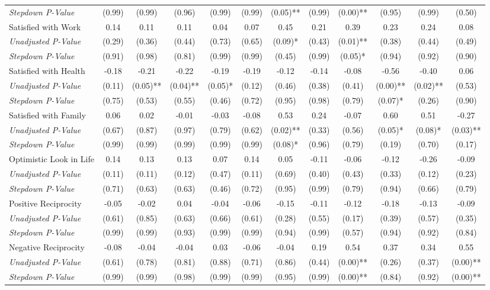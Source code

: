 \begin{tabular}{l c c c c c c c c c c c}
\quad \textit{Stepdown P-Value} & (0.99) & (0.99) & (0.96) & (0.99) & (0.99) & (0.05)** & (0.99) & (0.00)** & (0.95) & (0.99) & (0.50) \\
Satisfied with Work & 0.14 & 0.11 & 0.11 & 0.04 & 0.07 & 0.45 & 0.21 & 0.39 & 0.23 & 0.24 & 0.08 \\
\quad \textit{Unadjusted P-Value} & (0.29) & (0.36) & (0.44) & (0.73) & (0.65) & (0.09)* & (0.43) & (0.01)** & (0.38) & (0.44) & (0.49) \\
\quad \textit{Stepdown P-Value} & (0.91) & (0.98) & (0.81) & (0.99) & (0.99) & (0.45) & (0.99) & (0.05)* & (0.94) & (0.92) & (0.90) \\
Satisfied with Health & -0.18 & -0.21 & -0.22 & -0.19 & -0.19 & -0.12 & -0.14 & -0.08 & -0.56 & -0.40 & 0.06 \\
\quad \textit{Unadjusted P-Value} & (0.11) & (0.05)** & (0.04)** & (0.05)* & (0.12) & (0.46) & (0.38) & (0.41) & (0.00)** & (0.02)** & (0.53) \\
\quad \textit{Stepdown P-Value} & (0.75) & (0.53) & (0.55) & (0.46) & (0.72) & (0.95) & (0.98) & (0.79) & (0.07)* & (0.26) & (0.90) \\
Satisfied with Family & 0.06 & 0.02 & -0.01 & -0.03 & -0.08 & 0.53 & 0.24 & -0.07 & 0.60 & 0.51 & -0.27 \\
\quad \textit{Unadjusted P-Value} & (0.67) & (0.87) & (0.97) & (0.79) & (0.62) & (0.02)** & (0.33) & (0.56) & (0.05)* & (0.08)* & (0.03)** \\
\quad \textit{Stepdown P-Value} & (0.99) & (0.99) & (0.99) & (0.99) & (0.99) & (0.08)* & (0.96) & (0.79) & (0.19) & (0.70) & (0.17) \\
Optimistic Look in Life & 0.14 & 0.13 & 0.13 & 0.07 & 0.14 & 0.05 & -0.11 & -0.06 & -0.12 & -0.26 & -0.09 \\
\quad \textit{Unadjusted P-Value} & (0.11) & (0.11) & (0.12) & (0.47) & (0.11) & (0.69) & (0.40) & (0.43) & (0.33) & (0.12) & (0.23) \\
\quad \textit{Stepdown P-Value} & (0.71) & (0.63) & (0.63) & (0.46) & (0.72) & (0.95) & (0.99) & (0.79) & (0.94) & (0.66) & (0.79) \\
Positive Reciprocity & -0.05 & -0.02 & 0.04 & -0.04 & -0.06 & -0.15 & -0.11 & -0.12 & -0.18 & -0.13 & -0.09 \\
\quad \textit{Unadjusted P-Value} & (0.61) & (0.85) & (0.63) & (0.66) & (0.61) & (0.28) & (0.55) & (0.17) & (0.39) & (0.57) & (0.35) \\
\quad \textit{Stepdown P-Value} & (0.99) & (0.99) & (0.93) & (0.99) & (0.99) & (0.94) & (0.99) & (0.57) & (0.94) & (0.92) & (0.84) \\
Negative Reciprocity & -0.08 & -0.04 & -0.04 & 0.03 & -0.06 & -0.04 & 0.19 & 0.54 & 0.37 & 0.34 & 0.55 \\
\quad \textit{Unadjusted P-Value} & (0.61) & (0.78) & (0.81) & (0.88) & (0.71) & (0.86) & (0.44) & (0.00)** & (0.26) & (0.37) & (0.00)** \\
\quad \textit{Stepdown P-Value} & (0.99) & (0.99) & (0.98) & (0.99) & (0.99) & (0.95) & (0.99) & (0.00)** & (0.84) & (0.92) & (0.00)** \\
\bottomrule
\end{tabular}
